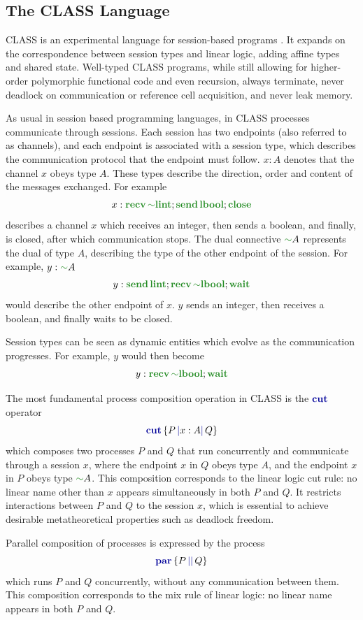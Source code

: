 \documentclass[sigconf,nonacm,natbib=true]{acmart}
\begin{document}
\subsection{The CLASS Language}

\acf{CLASS} is an experimental language for session-based programs \citep{Rocha:2023, Rocha:2022, Rocha:2021}. It expands on the correspondence between session types and linear logic, adding affine types and shared state. Well-typed \ac{CLASS} programs, while still allowing for higher-order polymorphic functional code and even recursion, always terminate, never deadlock on communication or reference cell acquisition, and never leak memory.

As usual in session based programming languages, in \ac{CLASS} processes communicate through sessions. Each session has two endpoints (also referred to as channels), and each endpoint is associated with a session type, which describes the communication protocol that the endpoint must follow. $x: A$ denotes that the channel $x$ obeys type $A$. These types describe the direction, order and content of the messages exchanged. For example
\[
    x : \recvt{\dualt{\lintt}}{\sendt{\lboolt}{\closet}}
\]
describes a channel $x$ which receives an integer, then sends a boolean, and finally, is closed, after which communication stops. The dual connective $\dualt{A}$ represents the dual of type $A$, describing the type of the other endpoint of the session. For example, $y: \dualt{A}$
\[
    y : \sendt{\lintt}{\recvt{\dualt{\lboolt}}{\waitt}}
\]
would describe the other endpoint of $x$. $y$ sends an integer, then receives a boolean, and finally waits to be closed.

Session types can be seen as dynamic entities which evolve as the communication progresses. For example, $y$ would then become
\[
    y : \recvt{\dualt{\lboolt}}{\waitt}
\]

The most fundamental process composition operation in \ac{CLASS} is the $\cutp$ operator
\[
    \cutc{P}{x: A}{Q}
\]
which composes two processes $P$ and $Q$ that run concurrently and communicate through a session $x$, where the endpoint $x$ in $Q$ obeys type $A$, and the endpoint $x$ in $P$ obeys type $\dualt{A}$. This composition corresponds to the linear logic cut rule: no linear name other than $x$ appears simultaneously in both $P$ and $Q$. It restricts interactions between $P$ and $Q$ to the session $x$, which is essential to achieve desirable metatheoretical properties such as deadlock freedom.

Parallel composition of processes is expressed by the process
$$
    \parc{P}{Q}
$$
which runs $P$ and $Q$ concurrently, without any communication between them. This composition corresponds to the mix rule of linear logic: no linear name appears in both $P$ and $Q$.
\end{document}
